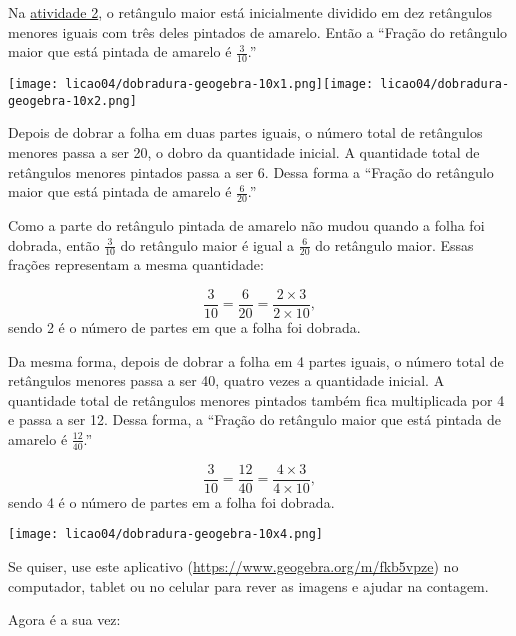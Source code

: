 \begin{refletindo*}
  Na \hyperref[chap4-ativ2]{atividade 2}, o retângulo maior está inicialmente dividido em dez retângulos menores iguais com três deles pintados de amarelo. Então a ``Fração do retângulo maior que está pintada de amarelo é $\frac{3}{10}$.''

\begin{center}
  \texttt{[image: licao04/dobradura-geogebra-10x1.png]}\quad \texttt{[image: licao04/dobradura-geogebra-10x2.png]}
\end{center}

  Depois de dobrar a folha em duas partes iguais, o número total de retângulos menores passa a ser 20, o dobro da quantidade inicial. A  quantidade total de retângulos menores pintados passa a ser 6. Dessa forma a ``Fração do retângulo maior que está pintada de amarelo é $\frac{6}{20}$.''

Como a parte do retângulo pintada de amarelo não mudou quando a folha foi dobrada,  então $\frac{3}{10}$ do retângulo maior é igual a  $\frac{6}{20}$ do retângulo maior. Essas frações representam a mesma quantidade:

$$\dfrac{3}{10} = \dfrac{6}{20} = \dfrac{2 \times 3}{2 \times 10},$$
sendo 2 é o número de partes em que a folha foi dobrada.

Da mesma forma, depois de dobrar a folha em 4 partes iguais, o número total de retângulos menores passa a ser 40, quatro vezes a quantidade inicial. A quantidade total de retângulos menores pintados também fica multiplicada por 4 e passa a ser 12. Dessa forma, a  ``Fração do retângulo maior que está pintada de amarelo é $\frac{12}{40}$.''

$$\dfrac{3}{10} = \dfrac{12}{40} = \dfrac{4 \times 3}{4 \times 10},$$
sendo 4 é o número de partes em a folha foi dobrada.

\begin{center}
\texttt{[image: licao04/dobradura-geogebra-10x4.png]}
\end{center}

Se quiser, use este aplicativo (\url{https://www.geogebra.org/m/fkb5vpze}) no computador, tablet ou no celular para rever as imagens e ajudar na contagem.

Agora é a sua vez:

\begin{center}
\end{center}


\end{refletindo*}
